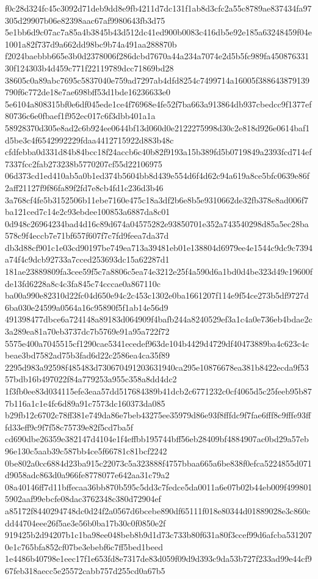 \documentclass[11pt,a4paper]{article}
\begin{document}
{f0c28d324fc45c3092d71deb9dd8e9fb4211d7dc131f1ab8d3cfc2a55c8789ae837434fa97305d29907b06e82398aac67af9980643fb3d75
5e1bb6d9c07ac7a85a4b3845b43d512dc41ed900b0083c416db5e92e185a63248459f04e1001a82f737d9a662dd98bc9b74a491aa288870b
f2024baebbb665e3b0d2378006f286dcbd7670a44a234a7074e2d5b5fc989fa45087633130f124303b4d459c771f22119789dcc71869bd28
38605c0a89abc7695c5837040e759ad7297ab4dfd8254c7499714a16005f388643879139790f6c772de18e7ae698bff53d1bde16236633e0
5e6104a808315bf0e6df045ede1ce4f76968e4fe52f7ba663a913864db937cbedcc9f1377ef80736c6e0fbaef1f952ec017c6f3dbb401a1a
58928370d305e8ad2c6b924ee0644bf13d060d0e2122275998d30c2e818d926e0614baf1d5be3c4f6542992229fdaa4412715922d883b48c
cfdfebba0d331d84b84bcc18f24accb6c40b82f9193a15b389fd5b0719849a2393fcd714ef7337fcc2fab273238b5770207cf55d22106975
06d373cd1ed410ab5a0b1ed374b5604bb8d439e554d6f4d62c94a619a8ce5bfc0639e86f2aff21127f9f86fa89f2fd7e8cb4fd1c236d3b46
3a768cf4fe5b3152506b11ebe7160e475c18a3df2b6e8b5e9310662de32fb378e8ad006f7ba121ced7c14e2c93ebdee100853a6887da8c01
0d948c26964234bad4d16c89d674a04575282e93850701e352a743540298d85a5ec28ba578c9f4eccb7e71bf657f607f7c7fd9feea7da37d
db3d88cf901c1e03cd90197be749ea713a39481eb01e138804d6979ee4e1544c9dc9c7394a74f4c9dcb92733a7cced253693dc15a62287d1
181ae23889809fa3cee59f5c7a8806c5ea74e3212e25f4a590d6a1bd0d4be323d49c19600fde13fd6228a8c4c3fa845c74cccae0a867110c
ba00a990e82310d22fc04d650e94c2c453c1302e0ba1661207f114e9f54ce273b5df9727d6ba030e24599a0564a16c95890f5f1ab14e56d9
491398477dbce6a724148a89183d064909f4bafb244a8240529ef3a1c4a0e736eb4bdae2c3a289ea81a70eb3737dc7b5769e91a95a722f72
5575e400a7045515cf1290cae5341ecedef963de104b4429d4729df40473889ba4c623c4cbeae3bd7582ad75b3fad6d22c2586ea4ca35f89
2295d983a92598f485483d730670491203631940ca295e10876678ea381b8422ecda9f5357bdb16b497022f84a779253a955c358a8dd4dc2
1f3fb0ee83d034115efe3eaa57dd517684389b41dcb2c6771232c0cf4065d5c25feeb95b877b116a1c1e4fc6d89a91c7573dc160373da085
b29fb12c6702c78ff381e749da86e7beb43275ee35979d86e93f8fffdc9f7fae6fff8c9fffe93fffd33eff9c9f7f58c75739e82f5cd7ba5f
cd690dbe26359e382147d4104e1f4effbb195744bff56eb28409bf4884907ac0bd29a57eb96e130c5aab39c587bb4ce5f66781c81bcf2242
0be802a0cc6884d23ba915c22073c5a323888f4757bbaa665a6be838f0efca5224855d071d9058adc863d0a966fe8778077e642aa31c79a2
08a40146ff7d11bffecaa36bb870b595c5dd3c7fedce5da0011a6e07b02b44eb009f4998015902aaf99ebcfe08dac3762348c380d72904ef
a85172f8440294748dc0d24f2a0567d6bcebe890df65111f018e80344d01889028e3c860cdd44704eee26f5ae3e56b0ba17b30c0f0850e2f
919425b2d94207b1c1ba98ee048beb8b9d1d73c733b80f631a80f3ccef99d6afcba5312070e1c765bfa852cf07be3ebebf6c7ff5bed1beed
1e4486b40798e1eec17f1e653fd8e7317de83d059f09d9d393c9da53b727f233ad99e44cf967feb318aecc5e25572cabb757d255cd0a67b5
}
\end{document}
